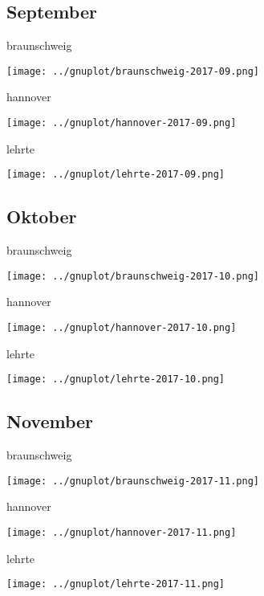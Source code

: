 \documentclass[aspectratio=169]{beamer} %
\begin{document}
\subsection{September}
\begin{frame}{braunschweig}
  \begin{center}
    \texttt{[image: ../gnuplot/braunschweig-2017-09.png]}
  \end{center}
\end{frame}
\begin{frame}{hannover}
  \begin{center}
    \texttt{[image: ../gnuplot/hannover-2017-09.png]}
  \end{center}
\end{frame}
\begin{frame}{lehrte}
  \begin{center}
    \texttt{[image: ../gnuplot/lehrte-2017-09.png]}
  \end{center}
\end{frame}

\subsection{Oktober}
\begin{frame}{braunschweig}
  \begin{center}
    \texttt{[image: ../gnuplot/braunschweig-2017-10.png]}
  \end{center}
\end{frame}
\begin{frame}{hannover}
  \begin{center}
    \texttt{[image: ../gnuplot/hannover-2017-10.png]}
  \end{center}
\end{frame}
\begin{frame}{lehrte}
  \begin{center}
    \texttt{[image: ../gnuplot/lehrte-2017-10.png]}
  \end{center}
\end{frame}

\subsection{November}
\begin{frame}{braunschweig}
  \begin{center}
    \texttt{[image: ../gnuplot/braunschweig-2017-11.png]}
  \end{center}
\end{frame}
\begin{frame}{hannover}
  \begin{center}
    \texttt{[image: ../gnuplot/hannover-2017-11.png]}
  \end{center}
\end{frame}
\begin{frame}{lehrte}
  \begin{center}
    \texttt{[image: ../gnuplot/lehrte-2017-11.png]}
  \end{center}
\end{frame}
\end{document}
